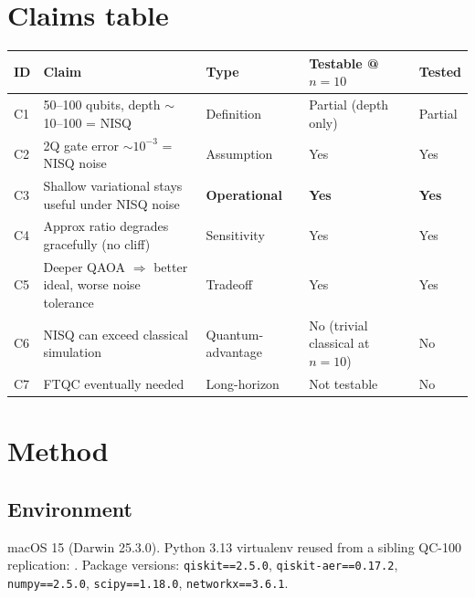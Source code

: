 \documentclass[11pt]{article}
\begin{document}
\section{Claims table}

\begin{longtable}{lp{7.5cm}lll}
\toprule
ID & Claim & Type & Testable @ $n{=}10$ & Tested \\
\midrule
\endhead
C1 & 50--100 qubits, depth $\sim$10--100 = NISQ & Definition & Partial (depth only) & Partial \\
C2 & 2Q gate error $\sim 10^{-3}$ = NISQ noise & Assumption & Yes & Yes \\
C3 & Shallow variational stays useful under NISQ noise & \textbf{Operational} & \textbf{Yes} & \textbf{Yes} \\
C4 & Approx ratio degrades gracefully (no cliff) & Sensitivity & Yes & Yes \\
C5 & Deeper QAOA $\Rightarrow$ better ideal, worse noise tolerance & Tradeoff & Yes & Yes \\
C6 & NISQ can exceed classical simulation & Quantum-advantage & No (trivial classical at $n{=}10$) & No \\
C7 & FTQC eventually needed & Long-horizon & Not testable & No \\
\bottomrule
\end{longtable}

\section{Method}

\subsection{Environment}
macOS 15 (Darwin 25.3.0). Python 3.13 virtualenv reused from a sibling QC-100 replication:
.
Package versions:
\texttt{qiskit==2.5.0},
\texttt{qiskit-aer==0.17.2},
\texttt{numpy==2.5.0},
\texttt{scipy==1.18.0},
\texttt{networkx==3.6.1}.
\end{document}
